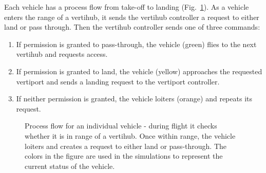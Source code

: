 Each vehicle has a process flow from take-off to landing (Fig.~\ref{fig:aircraftprocess}).
As a vehicle enters the range of a vertihub, it sends the vertihub controller a request to either land or pass through.
Then the vertihub controller sends one of three commands:
\begin{enumerate}
    \item If permission is granted to pass-through, the vehicle (green) flies to the next vertihub and requests access.
    \item If permission is granted to land, the vehicle (yellow) approaches the requested vertiport and sends a landing request to the vertiport controller.
    \item If neither permission is granted, the vehicle loiters (orange) and repeats its request.
 
\end{enumerate}

\begin{figure}
    \centering
    \scalebox{0.75}{}
    \caption{Process flow for an individual vehicle - during flight it checks whether it is in range of a vertihub. Once within range, the vehicle loiters and creates a request to either land or pass-through. The colors in the figure are used in the simulations to represent the current status of the vehicle.}
    \label{fig:aircraftprocess}
\end{figure}




%     




